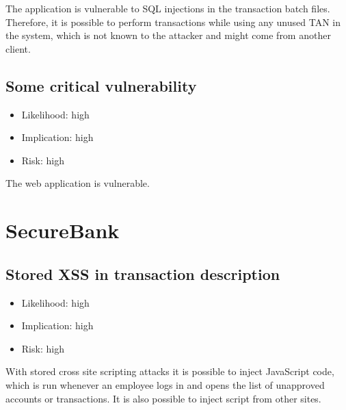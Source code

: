 The application is vulnerable to SQL injections in the transaction batch files. Therefore, it is possible to perform transactions while using any unused TAN in the system, which is not known to the attacker and might come from another client.

\subsection{Some critical vulnerability}
\begin{itemize}
	\item Likelihood: high
	\item Implication: high
	\item Risk: high
\end{itemize}

The web application is vulnerable.

\section{SecureBank}

\subsection{Stored XSS in transaction description}
\begin{itemize}
	\item Likelihood: high
	\item Implication: high
	\item Risk: high
\end{itemize}

With stored cross site scripting attacks it is possible to inject JavaScript code, which is run whenever an employee logs in and opens the list of unapproved accounts or transactions. It is also possible to inject script from other sites.
